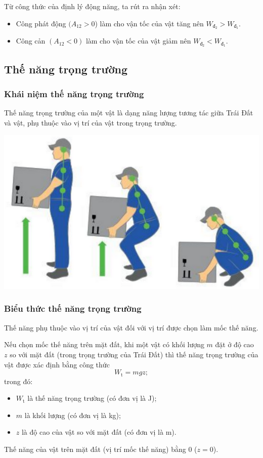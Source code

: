 \noindent Từ công thức của định lý động năng, ta rút ra nhận xét:
\begin{itemize}
	\item Công phát động $(A_{12}>0$) làm cho vận tốc của vật tăng nên $W_{\text{đ}_2} > W_{\text{đ}_1}$.
	\item Công cản $(A_{12}<0)$ làm cho vận tốc của vật giảm nên $W_{\text{đ}_2} < W_{\text{đ}_1}$.
\end{itemize}
\subsection{Thế năng trọng trường}
\subsubsection{Khái niệm thế năng trọng trường}

Thế năng trọng trường của một vật là dạng năng lượng tương tác giữa Trái Đất và vật, phụ thuộc vào vị trí của vật trong trọng trường.	
\begin{center}
	\includegraphics[scale=0.4]{../figs/G10-020-1}
\end{center}
\subsubsection{Biểu thức thế năng trọng trường}

Thế năng phụ thuộc vào vị trí của vật đối với vị trí được chọn làm mốc thế năng. 

Nếu chọn mốc thế năng trên mặt đất, khi một vật có khối lượng $m$ đặt ở độ cao $z$ so với mặt đất (trong trọng trường của Trái Đất) thì thế năng trọng trường của vật được xác định bằng công thức
\begin{equation*}
	W_\text{t}=mgz;
\end{equation*}
trong đó:
\begin{itemize}
	\item $W_\text{t}$ là thế năng trọng trường (có đơn vị là J);
	\item $m$ là khối lượng (có đơn vị là kg);
	\item $z$ là độ cao của vật so với mặt đất (có đơn vị là m).
\end{itemize}
Thế năng của vật trên mặt đất (vị trí mốc thế năng) bằng 0 ($z=0$). 

